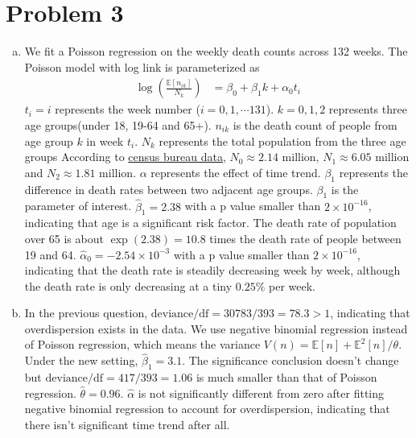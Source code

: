 \documentclass[12pt]{article}
\begin{document}
\section*{Problem 3}

\begin{enumerate}[(a)]
	\item We fit a Poisson regression on the weekly death counts across 132 weeks. The Poisson model with log link is parameterized as
	\begin{align*}
		\log(\frac{\mathbb{E}[n_{ik}]}{N_{k}}) &= \beta_{0} + \beta_{1}k + \alpha_{0} t_{i} 
	\end{align*}
	$t_{i} = i$ represents the week number ($i=0,1,\cdots 131$). $k=0,1,2$ represents three age groups(under 18, 19-64 and 65+).
	$n_{ik}$ is the death count of people from age group $k$ in week $t_{i}$. $N_{k}$ represents the total population from the three age groups According to \href{https://www.census.gov/quickfacts/MI}{census bureau data}, $N_{0}\approx 2.14$ million, $N_{1} \approx 6.05$ million and  $N_{2}\approx 1.81$ million. $\alpha$ represents the effect of time trend.  $\beta_1$ represents the difference in death rates between two adjacent age groups. $\beta_{1}$ is the parameter of interest.  $\hat{\beta}_{1} = 2.38$ with a p value smaller than $2\times 10^{-16}$, indicating that age is a significant risk factor. The death rate of population over 65 is about $\exp(2.38) = 10.8$ times the death rate of people between 19 and 64. $\hat{\alpha}_{0} = -2.54\times 10^{-3}$ with a p value smaller than $2\times 10^{-16}$, indicating that the death rate is steadily decreasing week by week, although the death rate is only decreasing at a tiny $0.25\%$ per week.
	\item In the previous question, $\text{deviance}/\text{df}=30783/393=78.3 > 1$, indicating that overdispersion exists in the data. We use negative binomial regression instead of Poisson regression, which means the variance $V(n) = \mathbb{E}[n] +\mathbb{E}^{2}[n]/\theta$. Under the new setting, $\hat{\beta}_{1} = 3.1$. The significance conclusion doesn't change but $\text{deviance}/\text{df}=417/393=1.06$ is much smaller than that of Poisson regression. $\hat{\theta}=0.96$. $\hat{\alpha}$ is not significantly different from zero after fitting negative binomial regression to account for overdispersion, indicating that there isn't significant time trend after all.
	

\end{enumerate}
\end{document}
